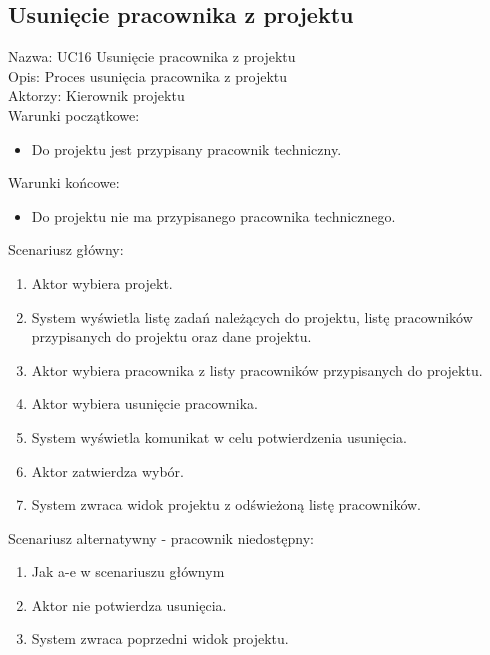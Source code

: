 \subsection{Usunięcie pracownika z projektu}
Nazwa: UC16 Usunięcie pracownika z projektu \\
Opis: Proces usunięcia pracownika z projektu \\
Aktorzy: Kierownik projektu \\
Warunki początkowe:
\begin{itemize}
\item Do projektu jest przypisany pracownik techniczny.
\end{itemize}
Warunki końcowe:
\begin{itemize}
\item Do projektu nie ma przypisanego pracownika technicznego.
\end{itemize}
Scenariusz główny:
\begin{enumerate}
\item Aktor wybiera projekt.
\item System wyświetla listę zadań należących do projektu, listę pracowników przypisanych do projektu oraz dane projektu.
\item Aktor wybiera pracownika z listy pracowników przypisanych do projektu.
\item Aktor wybiera usunięcie pracownika.
\item System wyświetla komunikat w celu potwierdzenia usunięcia.
\item Aktor zatwierdza wybór.
\item System zwraca widok projektu z odświeżoną listę pracowników.
\end{enumerate}
Scenariusz alternatywny - pracownik niedostępny: 
\begin{enumerate}
\item Jak a-e w scenariuszu głównym
\item Aktor nie potwierdza usunięcia.
\item System zwraca poprzedni widok projektu.
\end{enumerate}

